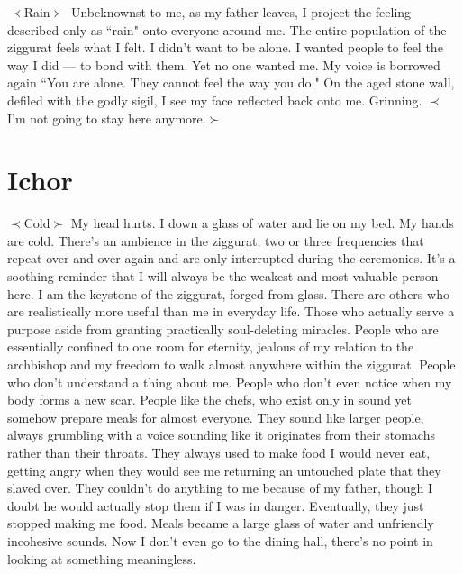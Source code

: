 \documentclass[openany, 12pt]{book}
\newcommand\tab[1][1cm]{\hspace*{#1}}
\begin{document}
\tab
$\prec$Rain$\succ$\newline
\tab
Unbeknownst to me, as my father leaves, I project the feeling described only as “rain" onto everyone around me. The entire population of the ziggurat feels what I felt. I didn't want to be alone. I wanted people to feel the way I did --- to bond with them. Yet no one wanted me. My voice is borrowed again “You are alone. They cannot feel the way you do." On the aged stone wall, defiled with the godly sigil, I see my face reflected back onto me. Grinning.\newline
$\prec$I'm not going to stay here anymore.$\succ$
\chapter{Ichor}
$\prec$Cold$\succ$\newline
\tab
My head hurts. I down a glass of water and lie on my bed. My hands are cold. There’s an ambience in the ziggurat; two or three frequencies that repeat over and over again and are only interrupted during the ceremonies. It’s a soothing reminder that I will always be the weakest and most valuable person here. I am the keystone of the ziggurat, forged from glass.
\newline
\tab
There are others who are realistically more useful than me in everyday life. Those who actually serve a purpose aside from granting practically soul-deleting miracles. People who are essentially confined to one room for eternity, jealous of my relation to the archbishop and my freedom to walk almost anywhere within the ziggurat. People who don’t understand a thing about me. People who don’t even notice when my body forms a new scar. People like the chefs, who exist only in sound yet somehow prepare meals for almost everyone. They sound like larger people, always grumbling with a voice sounding like it originates from their stomachs rather than their throats. They always used to make food I would never eat, getting angry when they would see me returning an untouched plate that they slaved over. They couldn’t do anything to me because of my father, though I doubt he would actually stop them if I was in danger. Eventually, they just stopped making me food. Meals became a large glass of water and unfriendly incohesive sounds.  Now I don’t even go to the dining hall, there’s no point in looking at something meaningless.
\newline
\tab
\end{document}
